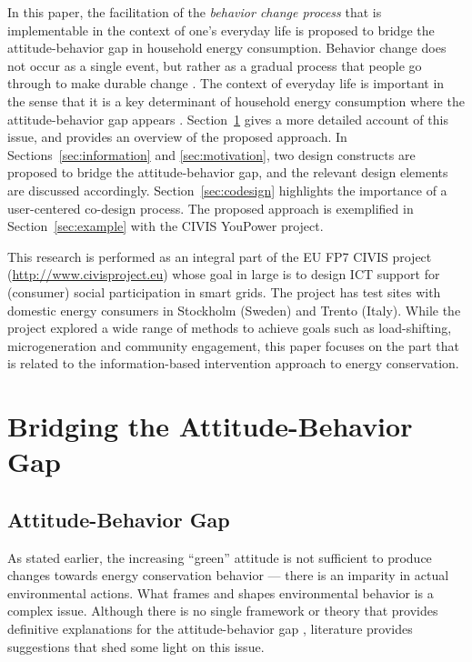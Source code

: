 \documentclass[a4paper,10pt]{article}
\begin{document}
In this paper, the facilitation of the \textit{behavior change process} that is implementable in the context of one's everyday life is proposed to bridge the attitude-behavior gap in household energy consumption. Behavior change does not occur as a single event, but rather as a gradual process that people go through to make durable change \citep{Niedderer2014}. The context of everyday life is important in the sense that it is a key determinant of household energy consumption where the attitude-behavior gap appears \citep{Burchell2014,Selvefors2015}. Section~\ref{sec:bridgingGap} gives a more detailed account of this issue, and provides an overview of the proposed approach. In Sections~\ref{sec:information} and \ref{sec:motivation}, two design constructs are proposed to bridge the attitude-behavior gap, and the relevant design elements are discussed accordingly. Section~\ref{sec:codesign} highlights the importance of a user-centered co-design process. The proposed approach is exemplified in Section~\ref{sec:example} with the CIVIS YouPower project.

This research is performed as an integral part of the EU FP7 CIVIS project (\url{http://www.civisproject.eu}) whose goal in large is to design ICT support for (consumer) social participation in smart grids. The project has test sites with domestic energy consumers in Stockholm (Sweden) and Trento (Italy). While the project explored a wide range of methods to achieve goals such as load-shifting, microgeneration and community engagement, this paper focuses on the part that is related to the information-based intervention approach to energy conservation.

\section{Bridging the Attitude-Behavior Gap} 
\label{sec:bridgingGap}

\subsection{Attitude-Behavior Gap } 
\label{sec:bridgingGap:gap}

As stated earlier, the increasing ``green'' attitude is not sufficient to produce changes towards energy conservation behavior --- there is an imparity in actual environmental actions. 
What frames and shapes environmental behavior is a complex issue. Although there is no single framework or theory that provides definitive explanations for the attitude-behavior gap \citep{Kollmuss2002,Schultz2014}, literature provides suggestions that shed some light on this issue. 
\end{document}
